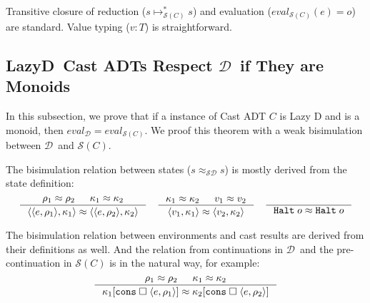 \documentclass[acmsmall,review,anonymous]{acmart}\settopmatter{printfolios=true,printccs=false,printacmref=false}
\newcommand{\judgeType}[2]{#1 : #2}
\newcommand{\lazyD}{Lazy\;D}
\newcommand{\sOOinspect}[3]{\langle\langle#1,#2\rangle,#3\rangle}
\newcommand{\sOOreturn}[2]{\langle#1,#2\rangle}
\newcommand{\sOOhalt}[1]{\mathtt{Halt} \; #1}
\newcommand{\kOOconsI}[3]{#3[\mathtt{cons} \; \square \; \langle#1,#2\rangle ]}
\newcommand{\hckOOconsI}[3]{\mathtt{cons_1}\;#1\;#2\;#3}
\newcommand{\judgeSreduceTrans}[3]{#2 \longmapsto_{\mathcal{S}(#1)}^{*} #3}
\newcommand{\judgeSeval}[3]{eval_{\mathcal{S}(#1)}(#2) = #3}
\newcommand{\eqvSD}[3]{#2 \approx_{\mathcal{SD}} #3}
\newcommand{\ineffCEKD}{$\mathcal{D}$}
\newcommand{\effCEK}[1]{$\mathcal{S}(#1)$}
\begin{document}

Transitive closure of reduction ($\judgeSreduceTrans{C}{s}{s}$) and 
evaluation ($\judgeSeval{C}{e}{o}$) are standard. Value typing 
($\judgeType{v}{T}$) is straightforward.

\subsection{\lazyD\ Cast ADTs Respect \ineffCEKD\ if They are 
Monoids}
\label{secc:framework:monoid-correct}

In this subsection, we prove that if a instance of Cast ADT $C$ is Lazy D and 
is a monoid, then $eval_\mathcal{D} = eval_{\mathcal{S}(C)}$. We proof this 
theorem with a weak bisimulation between \ineffCEKD\ and 
\effCEK{C}. 

The bisimulation relation between states ($\eqvSD{C}{s}{s}$) is mostly derived 
from the state definition: \begin{gather*}
\inference{
	\rho_1 \approx \rho_2 &
	\kappa_1 \approx \kappa_2
}{
	\sOOinspect{e}{\rho_1}{\kappa_1} \approx \sOOinspect{e}{\rho_2}{\kappa_2}
}
\quad
\inference{
	\kappa_1 \approx \kappa_2 &
	v_1 \approx v_2
}{
	\sOOreturn{v_1}{\kappa_1} \approx \sOOreturn{v_2}{\kappa_2}
}
\quad
\inference{
}{
	\sOOhalt{o} \approx \sOOhalt{o}
}
\end{gather*}

The bisimulation relation between environments and cast results are derived 
from their definitions as well. And the relation from continuations in 
\ineffCEKD\ and the pre-continuation in \effCEK{C} is in the natural way, for 
example: \begin{gather*}
\inference{
	\rho_1 \approx \rho_2 &
	\kappa_1 \approx \kappa_2
}{
	\kOOconsI{e}{\rho_1}{\kappa_1} \approx \kOOconsI{e}{\rho_2}{\kappa_2}
}
\end{gather*}
\end{document}
